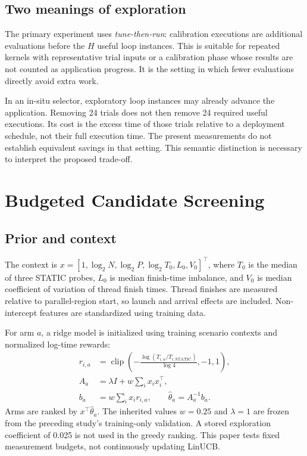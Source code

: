 \documentclass[conference]{IEEEtran}
\begin{document}
\subsection{Two meanings of exploration}

The primary experiment uses \emph{tune-then-run}: calibration executions are
additional evaluations before the $H$ useful loop instances. This is suitable
for repeated kernels with representative trial inputs or a calibration phase
whose results are not counted as application progress. It is the setting in
which fewer evaluations directly avoid extra work.

In an in-situ selector, exploratory loop instances may already advance the
application. Removing 24 trials does not then remove 24 required useful
executions. Its cost is the excess time of those trials relative to a
deployment schedule, not their full execution time. The present measurements
do not establish equivalent savings in that setting. This semantic distinction
is necessary to interpret the proposed trade-off.

\section{Budgeted Candidate Screening}

\subsection{Prior and context}

The context is
$x=[1,\log_2N,\log_2P,\log_2T_0,L_0,V_0]^\top$, where $T_0$ is the median
of three STATIC probes, $L_0$ is median finish-time imbalance, and $V_0$ is
median coefficient of variation of thread finish times. Thread finishes are
measured relative to parallel-region start, so launch and arrival effects
are included. Non-intercept features are standardized using training data.

For arm $a$, a ridge model is initialized using training scenario contexts and
normalized log-time rewards:
\begin{align}
 r_{i,a}&=\operatorname{clip}\left(
 -\frac{\log(T_{i,a}/T_{i,\mathrm{STATIC}})}{\log4},-1,1\right),\\
 A_a&=\lambda I+w\sum_i x_ix_i^\top,\\
 b_a&=w\sum_i x_i r_{i,a},\qquad
 \hat\theta_a=A_a^{-1}b_a.
\end{align}
Arms are ranked by $x^\top\hat\theta_a$. The inherited values
$w=0.25$ and $\lambda=1$ are frozen from the preceding study's training-only
validation. A stored exploration coefficient of 0.025 is not used in the
greedy ranking. This paper tests fixed measurement budgets, not continuously
updating LinUCB.
\end{document}
